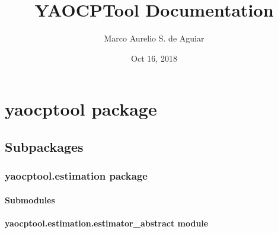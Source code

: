 \documentclass[letterpaper,10pt,english]{sphinxmanual}
\title{YAOCPTool Documentation}
\date{Oct 16, 2018}
\author{Marco Aurelio S. de Aguiar}
\begin{document}
\pagestyle{empty}
\maketitle
\pagestyle{plain}
\sphinxtableofcontents
\pagestyle{normal}
\label{\detokenize{index::doc}}



\chapter{yaocptool package}
\label{\detokenize{yaocptool:yaocptool-package}}\label{\detokenize{yaocptool::doc}}

\section{Subpackages}
\label{\detokenize{yaocptool:subpackages}}

\subsection{yaocptool.estimation package}
\label{\detokenize{yaocptool.estimation:yaocptool-estimation-package}}\label{\detokenize{yaocptool.estimation::doc}}

\subsubsection{Submodules}
\label{\detokenize{yaocptool.estimation:submodules}}

\subsubsection{yaocptool.estimation.estimator\_abstract module}
\label{\detokenize{yaocptool.estimation:module-yaocptool.estimation.estimator_abstract}}\label{\detokenize{yaocptool.estimation:yaocptool-estimation-estimator-abstract-module}}
\end{document}
